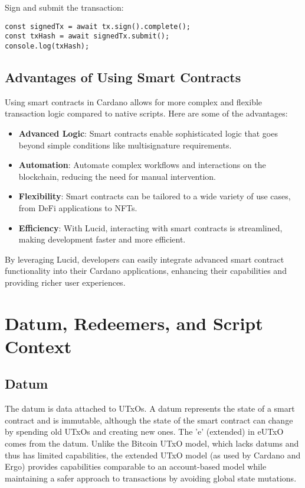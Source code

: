 Sign and submit the transaction:

\begin{lstlisting}
const signedTx = await tx.sign().complete();
const txHash = await signedTx.submit();
console.log(txHash);
\end{lstlisting}

\subsection{Advantages of Using Smart Contracts}

Using smart contracts in Cardano allows for more complex and flexible transaction logic compared to native scripts. Here are some of the advantages:

\begin{itemize}
\item \textbf{Advanced Logic}: Smart contracts enable sophisticated logic that goes beyond simple conditions like multisignature requirements.
\item \textbf{Automation}: Automate complex workflows and interactions on the blockchain, reducing the need for manual intervention.
\item \textbf{Flexibility}: Smart contracts can be tailored to a wide variety of use cases, from DeFi applications to NFTs.
\item \textbf{Efficiency}: With Lucid, interacting with smart contracts is streamlined, making development faster and more efficient.
\end{itemize}

By leveraging Lucid, developers can easily integrate advanced smart contract functionality into their Cardano applications, enhancing their capabilities and providing richer user experiences.

\section{Datum, Redeemers, and Script Context}

\subsection{Datum}
The datum is data attached to UTxOs. A datum represents the state of a smart contract and is immutable, although the state of the smart contract can change by spending old UTxOs and creating new ones. The 'e' (extended) in eUTxO comes from the datum. Unlike the Bitcoin UTxO model, which lacks datums and thus has limited capabilities, the extended UTxO model (as used by Cardano and Ergo) provides capabilities comparable to an account-based model while maintaining a safer approach to transactions by avoiding global state mutations.

